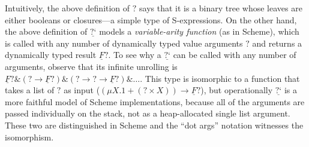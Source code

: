 \documentclass[acmsmall,nonacm]{acmart}
\renewcommand{\u}{\underline}
\newcommand{\dynv}{{?}}
\newcommand{\dync}{\u {\text{?`}}}
\newcommand{\with}{\mathbin{\&}}
\begin{document}
\begin{shortonly}
  Intuitively, the above definition of $\dynv$ says that it is a binary
  tree whose leaves are either booleans or closures---a simple type of
  S-expressions.  On the other hand, the above definition of $\dync$
  models a \emph{variable-arity function} (as in Scheme), which is
  called with any number of dynamically typed value arguments $\dynv$
  and returns a dynamically typed result $\u F \dynv$.  To see why a
  $\dync$ can be called with any number of arguments, observe that its
  infinite unrolling is $\u F \dynv \with (\dynv \to \u F \dynv) \with
  (\dynv \to \dynv \to \u F \dynv) \with \ldots$.  This type is
  isomorphic to a function that takes a list of $\dynv$ as input ($(\mu
  X. 1 + (\dynv \times X)) \to \u F \dynv$), but operationally $\dync$
  is a more faithful model of Scheme implementations, because all of the
  arguments are passed individually on the stack, not as a
  heap-allocated single list argument.  These two are distinguished in
  Scheme and the ``dot args'' notation witnesses the isomorphism.
\end{shortonly}
\end{document}
